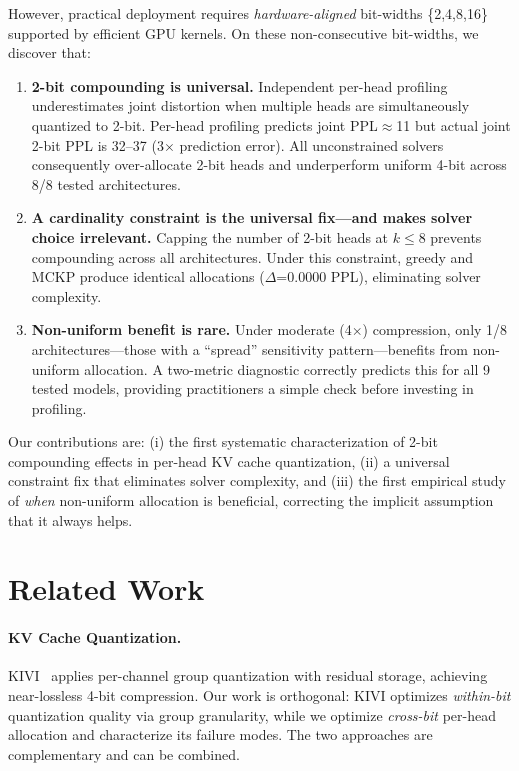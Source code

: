 \documentclass[11pt,a4paper]{article}
\begin{document}
However, practical deployment requires \emph{hardware-aligned} bit-widths \{2,4,8,16\} supported by efficient GPU kernels.
On these non-consecutive bit-widths, we discover that:
\begin{enumerate}
\item \textbf{2-bit compounding is universal.} Independent per-head profiling underestimates joint distortion when multiple heads are simultaneously quantized to 2-bit. Per-head profiling predicts joint PPL$\approx$11 but actual joint 2-bit PPL is 32--37 (3$\times$ prediction error). All unconstrained solvers consequently over-allocate 2-bit heads and underperform uniform 4-bit across 8/8 tested architectures.

\item \textbf{A cardinality constraint is the universal fix---and makes solver choice irrelevant.} Capping the number of 2-bit heads at $k\le 8$ prevents compounding across all architectures. Under this constraint, greedy and MCKP produce identical allocations ($\Delta$=0.0000 PPL), eliminating solver complexity.

\item \textbf{Non-uniform benefit is rare.} Under moderate (4$\times$) compression, only 1/8 architectures---those with a ``spread'' sensitivity pattern---benefits from non-uniform allocation. A two-metric diagnostic correctly predicts this for all 9 tested models, providing practitioners a simple check before investing in profiling.
\end{enumerate}

Our contributions are: (i) the first systematic characterization of 2-bit compounding effects in per-head KV cache quantization, (ii) a universal constraint fix that eliminates solver complexity, and (iii) the first empirical study of \emph{when} non-uniform allocation is beneficial, correcting the implicit assumption that it always helps.

\section{Related Work}
\label{sec:related}

\paragraph{KV Cache Quantization.}
KIVI~\cite{kivi2024} applies per-channel group quantization with residual storage, achieving near-lossless 4-bit compression.
Our work is orthogonal: KIVI optimizes \emph{within-bit} quantization quality via group granularity, while we optimize \emph{cross-bit} per-head allocation and characterize its failure modes.
The two approaches are complementary and can be combined.
\end{document}
